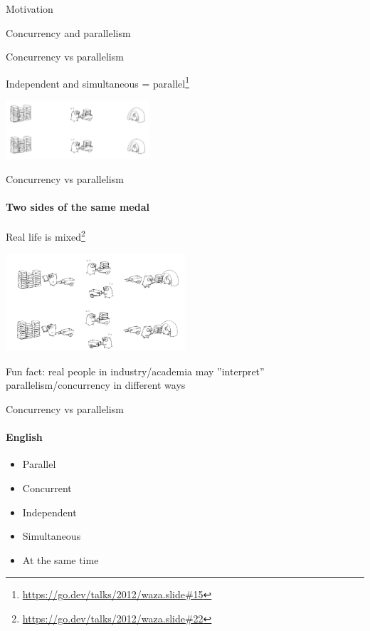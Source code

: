 \begin{section}{Motivation}
\begin{section}{Concurrency and parallelism}
\begin{frame}[fragile]{Concurrency vs parallelism}
\pause

Independent and simultaneous = parallel\footnote<2->{\tiny\url{https://go.dev/talks/2012/waza.slide#15}}

\begin{center}
\includegraphics[width=0.4\textwidth]{./pics/gopher_parallel.png}
\end{center}

\end{frame}

\begin{frame}[fragile]{Concurrency vs parallelism}
\framesubtitle{Two sides of the same medal}

Real life is mixed\footnote{\tiny\url{https://go.dev/talks/2012/waza.slide#22}}

\begin{center}
\includegraphics[width=0.5\textwidth]{./pics/gopher_mixed.png}
\end{center}

Fun fact: real people in industry/academia may ''interpret'' parallelism/concurrency in different ways

\end{frame}


\begin{frame}[t]{Concurrency vs parallelism}
\framesubtitle{English}

\begin{itemize}
    \item Parallel
    \item Concurrent
    \item Independent
    \item Simultaneous
    \item At the same time
\end{itemize}

\end{frame}


\end{section}
\end{section}
